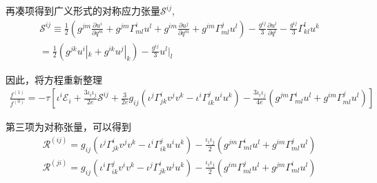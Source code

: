 \documentclass[LBMDerivation.tex]{subfiles}
\begin{document}
再凑项得到广义形式的对称应力张量$\mathcal{S}^{ij}$,
\begin{equation}
  \begin{gathered}
    \mathcal{S}^{ij}   \equiv \frac{1}{2} (g^{jm} \frac{\partial u^i}{\partial q^m}+g^{jm}\Gamma_{ml}^i u^l+g^{im} \frac{\partial u^j}{\partial q^m}+g^{im}\Gamma_{ml}^j u^l) -\frac{g^{ij}}{3}\frac{\partial u^l}{\partial q^l}-\frac{g^{ij}}{3} \Gamma_{kl}^l u^k\\=\frac{1}{2} (g^{jk} u^i|_k+g^{ik} u^j|_k) -\frac{g^{ij}}{3}u^l|_l
  \end{gathered}
\end{equation}






因此，将方程重新整理
\begin{equation}
  \begin{gathered}
    \frac{f^{(1)}}{f^{(0)}}=
    -\tau [\iota^i \mathcal{E}_i
      +\frac{3\iota_i \iota_j}{2e}\mathcal{S}^{ij}
      + \frac{3}{2e} g_{ij} (\iota^j\Gamma_{j k}^{i} v^j v^k - \iota^i\Gamma_{i k}^{j} u^i u^k) - \frac{3\iota_i\iota_j}{4e}(g^{jm}\Gamma_{ml}^i u^l + g^{im}\Gamma_{ml}^j u^l)
    ]
  \end{gathered}
\end{equation}






第三项为对称张量，可以得到
\begin{equation}
  \begin{gathered}
    \mathcal{R}^{(ij)} =g_{ij} (\iota^j\Gamma_{j k}^{i} v^j v^k - \iota^i\Gamma_{i k}^{j} u^i u^k) - \frac{\iota_i\iota_j}{2}(g^{jm}\Gamma_{ml}^i u^l + g^{im}\Gamma_{ml}^j u^l) \\
    \mathcal{R}^{(ji)}= g_{ij} (\iota^i\Gamma_{i k}^{j} v^i v^k - \iota^j \Gamma_{j k}^{i} u^j u^k) - \frac{\iota_i\iota_j}{2}(g^{im}\Gamma_{ml}^j u^l + g^{jm}\Gamma_{ml}^i u^l) \\
  \end{gathered}
\end{equation}
\end{document}
